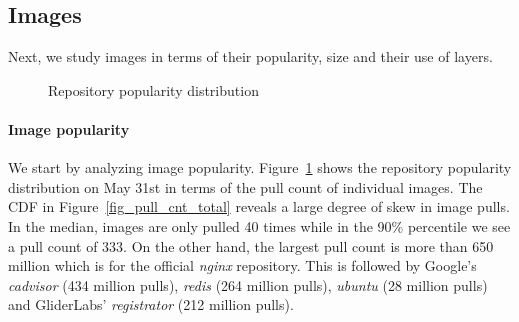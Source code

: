 \subsection{Images}
\label{sec:images}

Next, we study images in terms of their popularity, size and their use of layers.

\begin{figure}[!t]
	\centering
	\caption{Repository popularity distribution}
	\label{fig-pop}
\end{figure}

\paragraph{Image popularity}
%
We start by analyzing image popularity.
Figure~\ref{fig-pop} shows the repository popularity distribution on May 31st in
terms of the pull count of individual images.
The CDF in Figure~\ref{fig_pull_cnt_total} reveals a large degree of skew in image
pulls. In the median, images are only pulled 40 times while in the 90\% percentile we
see a pull count of 333. On the other hand, the largest pull count is more than 650 million
which is for the official \textit{nginx} repository. This is followed by
Google's \textit{cadvisor} (434 million pulls), \textit{redis} (264 million pulls),
\textit{ubuntu} (28 million pulls) and GliderLabs' \textit{registrator} (212 million pulls).



